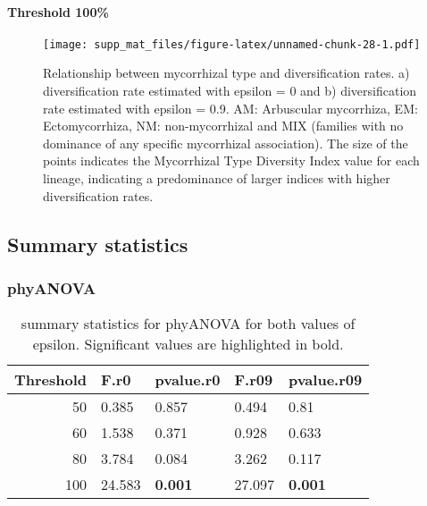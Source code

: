 \documentclass[]{article}
\let\oldparagraph\paragraph
\renewcommand{\paragraph}[1]{\oldparagraph{#1}\mbox{}}
\begin{document}
\pagebreak

\hypertarget{threshold-100-2}{%
\paragraph{Threshold 100\%}\label{threshold-100-2}}

\begin{figure}
\centering
\texttt{[image: supp\_mat\_files/figure-latex/unnamed-chunk-28-1.pdf]}
\caption{Relationship between mycorrhizal type and diversification
rates. a) diversification rate estimated with epsilon = 0 and b)
diversification rate estimated with epsilon = 0.9. AM: Arbuscular
mycorrhiza, EM: Ectomycorrhiza, NM: non-mycorrhizal and MIX (families
with no dominance of any specific mycorrhizal association). The size of
the points indicates the Mycorrhizal Type Diversity Index value for each
lineage, indicating a predominance of larger indices with higher
diversification rates.}
\end{figure}

\pagebreak

\hypertarget{summary-statistics-2}{%
\subsection{Summary statistics}\label{summary-statistics-2}}

\hypertarget{phyanova-4}{%
\subsubsection{phyANOVA}\label{phyanova-4}}

\begin{table}[H]

\caption{\label{tab:unnamed-chunk-29}summary statistics for phyANOVA for both values of epsilon. Significant values are highlighted in bold.}
\centering
\begin{tabular}{r|l|l|l|l}
\hline
Threshold & F.r0 & pvalue.r0 & F.r09 & pvalue.r09\\
\hline
50 & 0.385 & 0.857 & 0.494 & 0.81\\
\hline
60 & 1.538 & 0.371 & 0.928 & 0.633\\
\hline
80 & 3.784 & 0.084 & 3.262 & 0.117\\
\hline
100 & 24.583 & \textbf{0.001} & 27.097 & \textbf{0.001}\\
\hline
\end{tabular}
\end{table}
\end{document}
